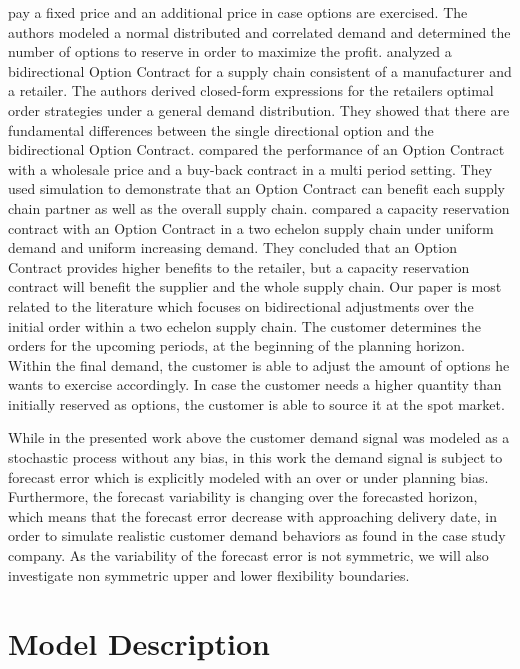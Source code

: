 \documentclass[12pt,english]{article}
\begin{document}
pay a fixed price and an additional price in case options are exercised.
The authors modeled a normal distributed and correlated demand and
determined the number of options to reserve in order to maximize the
profit. \citet{Zhao2013375} analyzed a bidirectional Option Contract
for a supply chain consistent of a manufacturer and a retailer. The
authors derived closed-form expressions for the retailers optimal
order strategies under a general demand distribution. They showed
that there are fundamental differences between the single directional
option and the bidirectional Option Contract. \citet{Gomez-Padilla2009}
compared the performance of an Option Contract with a wholesale price
and a buy-back contract in a multi period setting. They used simulation
to demonstrate that an Option Contract can benefit each supply chain
partner as well as the overall supply chain. \citet{Gomez2013} compared
a capacity reservation contract with an Option Contract in a two echelon
supply chain under uniform demand and uniform increasing demand. They
concluded that an Option Contract provides higher benefits to the
retailer, but a capacity reservation contract will benefit the supplier
and the whole supply chain. Our paper is most related to the literature
which focuses on bidirectional adjustments over the initial order
within a two echelon supply chain. The customer determines the orders
for the upcoming periods, at the beginning of the planning horizon.
Within the final demand, the customer is able to adjust the amount
of options he wants to exercise accordingly. In case the customer
needs a higher quantity than initially reserved as options, the customer
is able to source it at the spot market. 

While in the presented work above the customer demand signal was modeled
as a stochastic process without any bias, in this work the demand
signal is subject to forecast error which is explicitly modeled with
an over or under planning bias. Furthermore, the forecast variability
is changing over the forecasted horizon, which means that the forecast
error decrease with approaching delivery date, in order to simulate
realistic customer demand behaviors as found in the case study company.
As the variability of the forecast error is not symmetric, we will
also investigate non symmetric upper and lower flexibility boundaries.

\section{Model Description}
\end{document}
